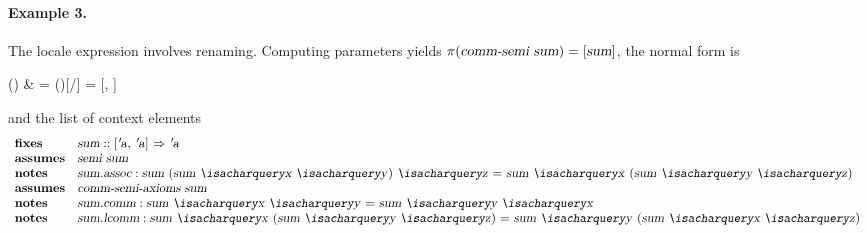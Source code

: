 \begin{isabellebody}
\begin{isamarkuptext}
\paragraph{Example 3.}
  The locale expression  involves
  renaming.  Computing parameters yields $\pi(\emph{\sl comm{\mbox{-}}semi\ sum})
  = [\emph{\sl sum}]$, the normal form is
\begin{align*%
}
  \N() & =
  \N()[/] =
  [, ]
\end{align*%
}
  and the list of context elements
\[
\begin{array}{ll}
  \textbf{fixes} & \isa{sum} :: \isa{{\isachardoublequote}{\isacharbrackleft}{\isacharprime}a{\isacharcomma}\ {\isacharprime}a{\isacharbrackright}\ {\isasymRightarrow}\ {\isacharprime}a{\isachardoublequote}} \\
  \textbf{assumes} & \isa{{\isachardoublequote}semi\ sum{\isachardoublequote}} \\
  \textbf{notes} & \isa{sum{\isachardot}assoc}: \isa{{\isachardoublequote}sum\ {\isacharparenleft}sum\ {\isacharquery}x\ {\isacharquery}y{\isacharparenright}\ {\isacharquery}z\ {\isacharequal}\ sum\ {\isacharquery}x\ {\isacharparenleft}sum\ {\isacharquery}y\ {\isacharquery}z{\isacharparenright}{\isachardoublequote}} \\
  \textbf{assumes} & \isa{{\isachardoublequote}comm{\isacharunderscore}semi{\isacharunderscore}axioms\ sum{\isachardoublequote}} \\
  \textbf{notes} & \isa{sum{\isachardot}comm}: \isa{{\isachardoublequote}sum\ {\isacharquery}x\ {\isacharquery}y\ {\isacharequal}\ sum\ {\isacharquery}y\ {\isacharquery}x{\isachardoublequote}} \\
  \textbf{notes} & \isa{sum{\isachardot}lcomm}: \isa{{\isachardoublequote}sum\ {\isacharquery}x\ {\isacharparenleft}sum\ {\isacharquery}y\ {\isacharquery}z{\isacharparenright}\ {\isacharequal}\ sum\ {\isacharquery}y\ {\isacharparenleft}sum\ {\isacharquery}x\ {\isacharquery}z{\isacharparenright}{\isachardoublequote}}
\end{array}
\]


\end{isamarkuptext}
\end{isabellebody}

